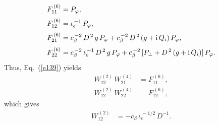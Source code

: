 \documentclass[12pt,prb,aps]{revtex4-1}
\begin{document}
\begin{align}
F^{\,(6)}_{11} &=P_\varphi,\\[0.5ex]
F^{\,(6)}_{12} &= \iota_e^{\,-1}\,P_\varphi,\\[0.5ex]
F^{\,(6)}_{21} &=c_\beta^{\,-2}\,D^{\,2}\,g\,P_\varphi + c_\beta^{\,-2}\,D^{\,2}\,(g+{\rm i}\,Q_i)\,P_\varphi,\\[0.5ex]
F^{\,(6)}_{22} &=c_\beta^{\,-2}\,\iota_e^{\,-1}\,D^{\,2}\,g\,P_\varphi + c_\beta^{\,-2}\,[P_\perp+D^{\,2}\,(g+{\rm i}\,Q_i)]\,P_\varphi.
\end{align}
Thus, Eq.~(\ref{e139}) yields
\begin{align}
W_{12}^{\,(2)}\,W_{21}^{\,(4)} &= F_{11}^{\,(6)},\\[0.5ex]
W_{12}^{\,(2)}\,W_{22}^{\,(4)} &= F_{12}^{\,(6)},
\end{align}
which gives 
\begin{align}
W_{12}^{\,(2)} &= - c_\beta\,\iota_e^{\,-1/2}\,D^{-1}.
\end{align}
\end{document}
